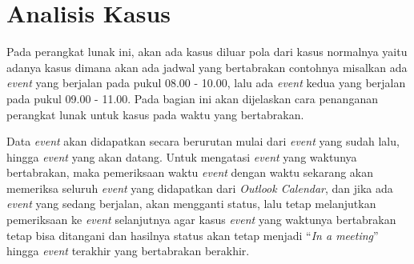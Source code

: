 \section{Analisis Kasus}
Pada perangkat lunak ini, akan ada kasus diluar pola dari kasus normalnya yaitu adanya kasus dimana akan ada jadwal yang bertabrakan contohnya misalkan ada \textit{event} yang berjalan pada pukul 08.00 - 10.00, lalu ada \textit{event} kedua yang berjalan pada pukul 09.00 - 11.00. Pada bagian ini akan dijelaskan cara penanganan perangkat lunak untuk kasus pada waktu yang bertabrakan. 

Data \textit{event} akan didapatkan secara berurutan mulai dari \textit{event} yang sudah lalu, hingga \textit{event} yang akan datang. Untuk mengatasi \textit{event} yang waktunya bertabrakan, maka pemeriksaan waktu \textit{event} dengan waktu sekarang akan memeriksa seluruh \textit{event} yang didapatkan dari \textit{Outlook Calendar}, dan jika ada \textit{event} yang sedang berjalan, akan mengganti status, lalu tetap melanjutkan pemeriksaan ke \textit{event} selanjutnya agar kasus \textit{event} yang waktunya bertabrakan tetap bisa ditangani dan hasilnya status akan tetap menjadi ``\textit{In a meeting}'' hingga \textit{event} terakhir yang bertabrakan berakhir. 
